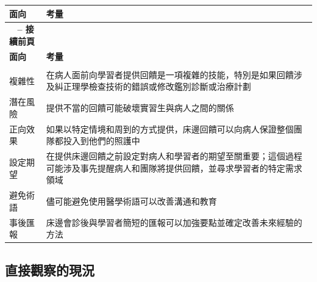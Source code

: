 \documentclass[12pt,a4paper]{article}
\begin{document}
\begin{longtable}{>{\raggedright\arraybackslash}p{4cm} >{\raggedright\arraybackslash}p{11cm}}
\toprule
\textbf{\textcolor{emergency_red}{面向}} & \textbf{\textcolor{emergency_red}{考量}} \\
\midrule
\endfirsthead

\multicolumn{2}{c}%
{{\bfseries \tablename\ \thetable{} -- 接續前頁}} \\
\toprule
\textbf{\textcolor{emergency_red}{面向}} & \textbf{\textcolor{emergency_red}{考量}} \\
\midrule
\endhead

\midrule \multicolumn{2}{r}{{接續下頁}} \\ \midrule
\endfoot

\bottomrule
\endlastfoot

\textcolor{emergency_blue}{複雜性} & 在病人面前向學習者提供回饋是一項複雜的技能，特別是如果回饋涉及糾正理學檢查技術的錯誤或修改鑑別診斷或治療計劃 \\

\textcolor{emergency_blue}{潛在風險} & 提供不當的回饋可能破壞實習生與病人之間的關係 \\

\textcolor{emergency_blue}{正向效果} & 如果以特定情境和周到的方式提供，床邊回饋可以向病人保證整個團隊都投入到他們的照護中 \\

\textcolor{emergency_blue}{設定期望} & 在提供床邊回饋之前設定對病人和學習者的期望至關重要；這個過程可能涉及事先提醒病人和團隊將提供回饋，並尋求學習者的特定需求領域 \\

\textcolor{emergency_blue}{避免術語} & 儘可能避免使用醫學術語可以改善溝通和教育 \\

\textcolor{emergency_blue}{事後匯報} & 床邊會診後與學習者簡短的匯報可以加強要點並確定改善未來經驗的方法 \\
\end{longtable}

\subsection{直接觀察的現況}
\end{document}
